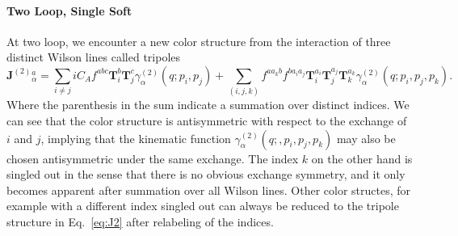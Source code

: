 \documentclass[a4paper,11pt]{article}
\begin{document}
\paragraph{Two Loop, Single Soft}
At two loop, we encounter a new color structure from the interaction of three distinct Wilson lines called tripoles
\begin{equation}
\mathbf{J}^{(2)}{}^a_\alpha = \sum_{i \neq j} i C_A f^{abc} \mathbf{T}_i^b \mathbf{T}_j^c \gamma_\alpha^{(2)}(q; p_i, p_j) + \sum_{(i,j,k)} f^{a a_k b} f^{b a_i a_j} \mathbf{T}_i^{a_i} \mathbf{T}_j^{a_j} \mathbf{T}_k^{a_k} \gamma^{(2)}_\alpha (q; p_i, p_j, p_k).
\label{eq:J2}
\end{equation}
Where the parenthesis in the sum indicate a summation over distinct indices. We can see that the color structure is antisymmetric with respect to the exchange of $i$ and $j$, implying that the kinematic function $\gamma_\alpha^{(2)}(q;, p_i, p_j, p_k)$ may also be chosen antisymmetric under the same exchange. The index $k$ on the other hand is singled out in the sense that there is no obvious exchange symmetry, and it only becomes apparent after summation over all Wilson lines. Other color structes, for example with a different index singled out can always be reduced to the tripole structure in Eq.~\eqref{eq:J2} after relabeling of the indices.
\end{document}
